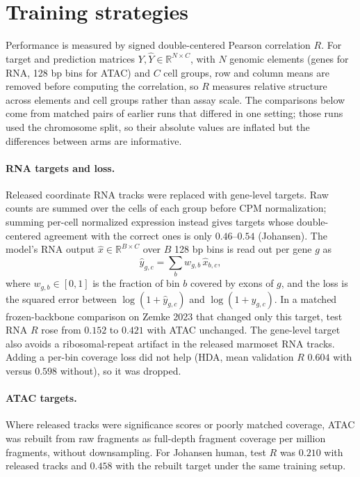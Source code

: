 \documentclass[11pt]{article}
\begin{document}
\section{Training strategies}
Performance is measured by signed double-centered Pearson correlation $R$. For
target and prediction matrices $Y,\hat{Y}\in\mathbb{R}^{N\times C}$, with $N$
genomic elements (genes for RNA, 128 bp bins for ATAC) and $C$ cell groups, row
and column means are removed before computing the correlation, so $R$ measures
relative structure across elements and cell groups rather than assay scale.
The comparisons below come from matched pairs of earlier runs that differed
in one setting; those runs used the chromosome split, so their absolute values
are inflated but the differences between arms are informative.

\paragraph{RNA targets and loss.} Released coordinate RNA tracks were replaced
with gene-level targets. Raw counts are summed over the cells of each group
before CPM normalization; summing per-cell normalized expression instead gives
targets whose double-centered agreement with the correct ones is only
$0.46$--$0.54$ (Johansen). The model's RNA output $\hat{x}\in\mathbb{R}^{B\times
C}$ over $B$ 128 bp bins is read out per gene $g$ as \begin{equation}
\hat{y}_{g,c}=\sum_{b} w_{g,b}\,\hat{x}_{b,c},
\end{equation}
where $w_{g,b}\in[0,1]$ is the fraction of bin $b$ covered by exons of $g$,
and the loss is the squared error between $\log(1+\hat{y}_{g,c})$ and
$\log(1+y_{g,c})$. In a matched frozen-backbone comparison on Zemke 2023 that
changed only this target, test RNA $R$ rose from $0.152$ to $0.421$ with ATAC
unchanged. The gene-level target also avoids a ribosomal-repeat artifact in the
released marmoset RNA tracks. Adding a per-bin coverage loss did not help (HDA,
mean validation $R$ $0.604$ with versus $0.598$ without), so it was dropped.

\paragraph{ATAC targets.} Where released tracks were significance scores or
poorly matched coverage, ATAC was rebuilt from raw fragments as full-depth
fragment coverage per million fragments, without downsampling. For Johansen
human, test $R$ was $0.210$ with released tracks and $0.458$ with the rebuilt
target under the same training setup.
\end{document}
